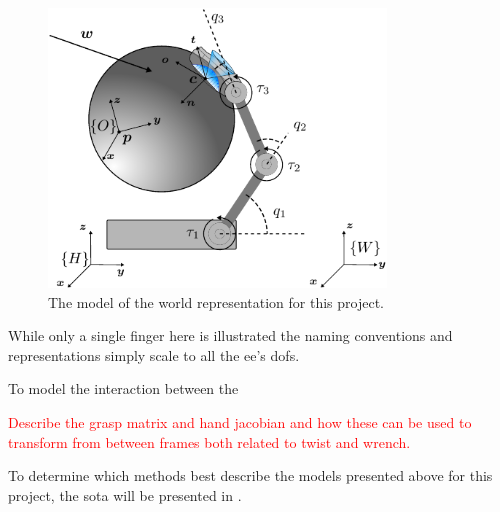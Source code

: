 
\begin{figure}[h]
	\begin{small}
		\begin{center}
			\includegraphics[width=0.8\textwidth]{chapters/modeling/fig/test-hand-kinematics-crop.pdf}
		\end{center}
		\caption{The model of the world representation for this project.}
		\label{fig:full-system-model}
	\end{small}
\end{figure}


While only a single finger here is illustrated the naming conventions and representations simply scale to all the \gls{ee}'s \gls{dof}s.\medskip

To model the interaction between the 

\textcolor{red}{Describe the grasp matrix and hand jacobian and how these can be used to transform from between frames both related to twist and wrench.}

To determine which methods best describe the models presented above for this project, the \gls{sota} will be presented in .


